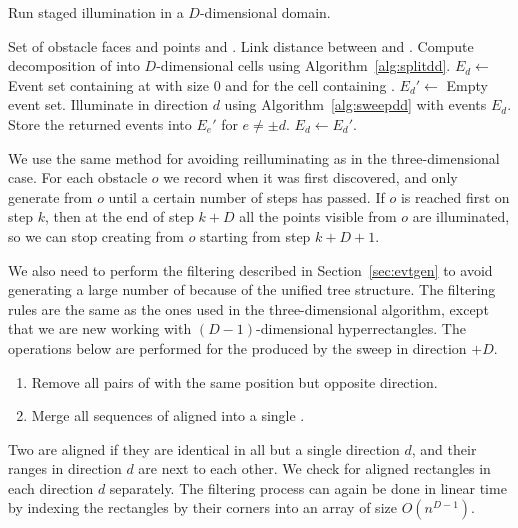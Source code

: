\documentclass[english,gradu]{tktltiki2018}
\begin{document}
\begin{algorithm}
\caption{Run staged illumination in a $D$-dimensional domain.}
\label{alg:minlinkdd}
\begin{algorithmic}
\Require Set of obstacle faces and points \spt and \ept.
\Output Link distance between \spt and \ept.
\State Compute decomposition of \fspace into $D$-dimensional cells using Algorithm~\ref{alg:splitdd}.
	\State $E_d\gets$ Event set containing \addE at \spt with size 0 and \cellE for the cell containing \spt.
\EndFor
{}
		\State $E_d'\gets$ Empty event set.
	\EndFor
		\State Illuminate in direction $d$ using Algorithm~\ref{alg:sweepdd} with events $E_d$.
		\State Store the returned events into $E_e'$ for $e\neq\pm d$.
	\EndFor
		\State $E_d\gets E_d'$.
	\EndFor
\EndWhile
\end{algorithmic}
\end{algorithm}

We use the same method for avoiding reilluminating as in the three-dimensional case.
For each obstacle $o$ we record when it was first discovered, and only generate \addEs from $o$ until a certain number of steps has passed.
If $o$ is reached first on step $k$, then at the end of step $k+D$ all the points visible from $o$ are illuminated, so we can stop creating \addEs from $o$ starting from step $k+D+1$.

We also need to perform the filtering described in Section~\ref{sec:evtgen} to avoid generating a large number of \addEs because of the unified tree structure.
The filtering rules are the same as the ones used in the three-dimensional algorithm, except that we are new working with $(D-1)$-dimensional hyperrectangles.
The operations below are performed for the \addEs produced by the sweep in direction $+D$.
\begin{enumerate}
\item Remove all pairs of \addEs with the same position but opposite direction.
\item Merge all sequences of aligned \addEs into a single \addE.
\end{enumerate}

Two \addEs are aligned if they are identical in all but a single direction $d$, and their ranges in direction $d$ are next to each other.
We check for aligned rectangles in each direction $d$ separately.
The filtering process can again be done in linear time by indexing the rectangles by their corners into an array of size $O(n^{D-1})$.
\end{document}
